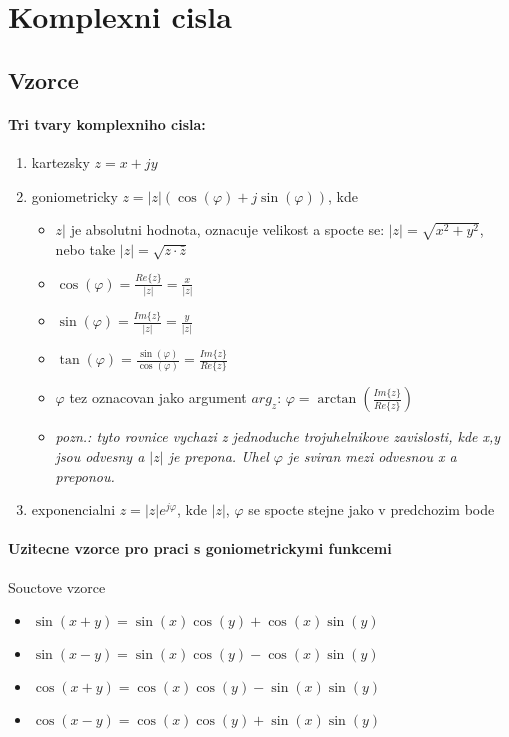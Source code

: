 \chapter{Komplexni cisla}

\section*{Vzorce}

\subsubsection*{Tri tvary komplexniho cisla:}
\begin{enumerate}
  \item kartezsky $z=x+jy$
  \item goniometricky $z=|z|(\operatorname{cos}(\varphi)+j\operatorname{sin}(\varphi))$, kde 
  \begin{itemize}
    \item $z|$ je absolutni hodnota, oznacuje velikost a spocte se: $|z|=\sqrt{x^2+y^2}$, nebo take $|z|=\sqrt{z\cdot \bar{z}}$
    \item $\operatorname{cos}(\varphi)=\frac{Re\{z\}}{|z|} = \frac{x}{|z|}$
    \item $\operatorname{sin}(\varphi) = \frac{Im\{z\}}{|z|} = \frac{y}{|z|}$
    \item $\operatorname{tan}(\varphi) = \frac{\operatorname{sin}(\varphi)}{\operatorname{cos}(\varphi)}=\frac{Im\{z\}}{Re\{z\}}$
    \item $\varphi$ tez oznacovan jako argument $arg_z$: $\varphi = \operatorname{arctan}\left( \frac{Im\{z\}}{Re\{z\}}\right)$
    \item \textit{pozn.: tyto rovnice vychazi z jednoduche trojuhelnikove zavislosti, kde x,y jsou odvesny a $|z|$ je prepona. Uhel $\varphi$ je sviran mezi odvesnou x a preponou.}
  \end{itemize}
  \item exponencialni $z=|z|e^{j\varphi}$, kde $|z|$, $\varphi$ se spocte stejne jako v predchozim bode
\end{enumerate}

\subsubsection*{\label{sec:go_vz}Uzitecne vzorce pro praci s  goniometrickymi funkcemi}

Souctove vzorce
\begin{itemize}
\item $\operatorname{sin}(x+y)=\operatorname{sin}(x)\operatorname{cos}(y)+\operatorname{cos}(x)\operatorname{sin}(y)$
\item $\operatorname{sin}(x-y)=\operatorname{sin}(x)\operatorname{cos}(y)-\operatorname{cos}(x)\operatorname{sin}(y)$
\item $\operatorname{cos}(x+y)=\operatorname{cos}(x)\operatorname{cos}(y)-\operatorname{sin}(x)\operatorname{sin}(y)$
\item $\operatorname{cos}(x-y)=\operatorname{cos}(x)\operatorname{cos}(y)+\operatorname{sin}(x)\operatorname{sin}(y)$
\end{itemize}

